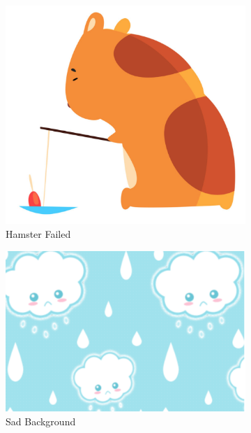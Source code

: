\documentclass[a4paper]{article}
\begin{document}
\begin{figure}[h!]
  \centering
  \begin{subfigure}[b]{0.3\linewidth}
    \includegraphics[width=\linewidth]{png-creation/hamster-failed.png}
    \caption{Hamster Failed}
    \label{fig:hamster_failed}
  \end{subfigure}
  \begin{subfigure}[b]{0.3\linewidth}
    \includegraphics[width=\linewidth]{png-creation/sad-background.png}
    \caption{Sad Background}
    \label{fig:sad_background}
   \end{subfigure}
   \begin{subfigure}[b]{0.3\linewidth}

\end{subfigure}
\end{figure}
\end{document}
